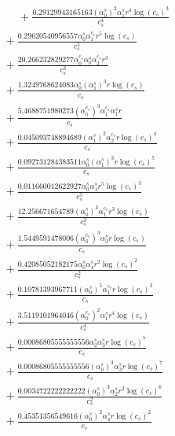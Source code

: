 \documentclass[10pt]{article}
\begin{document}
\begin{align*}
\phantom{R_{0,8}} &\phantom{={}}{}  + \frac{0.29129943165163 \left(\alpha_{0}^s\right)^{2} \alpha_{1}^s r^{4} \log{\left(c_{s} \right)}^{3}}{c_{s}^{4}} \\
&{}  + \frac{0.29620540956557 \alpha_{0}^s \alpha_{1}^{c_s} r^{5} \log{\left(c_{s} \right)}}{c_{s}^{5}} \\
&{}  + \frac{20.266232829277 \alpha_{0}^{c_s} \alpha_{0}^s \alpha_{2}^{c_s} r^{3}}{c_{s}^{3}} \\
&{}  + \frac{1.3249768624083 \alpha_{0}^s \left(\alpha_{1}^s\right)^{3} r \log{\left(c_{s} \right)}}{c_{s}} \\
&{}  + \frac{5.4688751980273 \left(\alpha_{0}^{c_s}\right)^{3} \alpha_{1}^{c_s} \alpha_{1}^s r}{c_{s}} \\
&{}  + \frac{0.045093748894689 \left(\alpha_{1}^s\right)^{2} \alpha_{2}^{c_s} r \log{\left(c_{s} \right)}^{4}}{c_{s}} \\
&{}  + \frac{0.092731284383511 \alpha_{0}^s \left(\alpha_{1}^s\right)^{3} r \log{\left(c_{s} \right)}^{5}}{c_{s}} \\
&{}  + \frac{0.011660012622927 \alpha_{0}^s \alpha_{1}^s r^{5} \log{\left(c_{s} \right)}^{3}}{c_{s}^{5}} \\
&{}  + \frac{12.256671654789 \left(\alpha_{0}^s\right)^{3} \alpha_{1}^{c_s} r^{3} \log{\left(c_{s} \right)}}{c_{s}^{3}} \\
&{}  + \frac{1.5449591478006 \left(\alpha_{0}^{c_s}\right)^{3} \alpha_{3}^s r \log{\left(c_{s} \right)}}{c_{s}} \\
&{}  + \frac{0.42085052182175 \alpha_{0}^s \alpha_{4}^s r^{2} \log{\left(c_{s} \right)}^{2}}{c_{s}^{2}} \\
&{}  + \frac{0.10781393967711 \left(\alpha_{0}^s\right)^{5} \alpha_{1}^{c_s} r \log{\left(c_{s} \right)}^{3}}{c_{s}} \\
&{}  + \frac{3.5119101964046 \left(\alpha_{0}^{c_s}\right)^{2} \alpha_{1}^s r^{4} \log{\left(c_{s} \right)}}{c_{s}^{4}} \\
&{}  + \frac{0.00086805555555556 \alpha_{2}^s \alpha_{3}^s r \log{\left(c_{s} \right)}^{7}}{c_{s}} \\
&{}  + \frac{0.00086805555555556 \left(\alpha_{0}^s\right)^{3} \alpha_{3}^s r \log{\left(c_{s} \right)}^{7}}{c_{s}} \\
&{}  + \frac{0.0034722222222222 \left(\alpha_{0}^s\right)^{3} \alpha_{2}^s r^{2} \log{\left(c_{s} \right)}^{6}}{c_{s}^{2}} \\
&{}  + \frac{0.45351356549616 \left(\alpha_{0}^s\right)^{2} \alpha_{4}^s r \log{\left(c_{s} \right)}^{2}}{c_{s}} \\

\end{align*}
\end{document}

